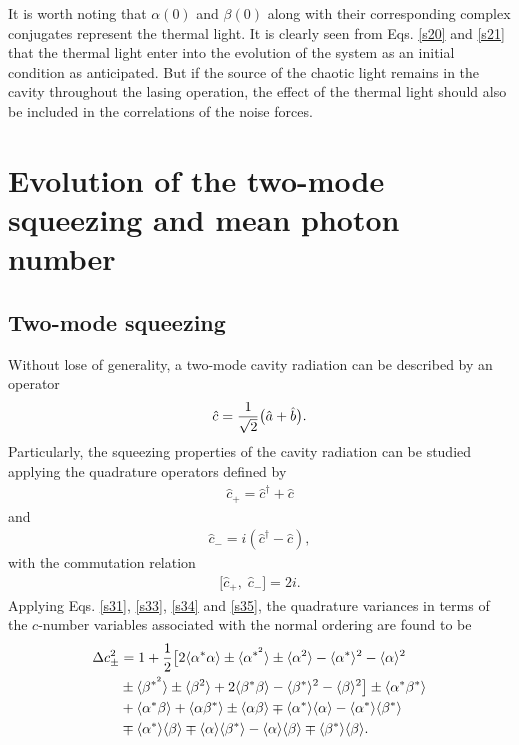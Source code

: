\documentclass[twocolumn,showpacs,preprintnumbers,amsmath,amssymb,pra]{revtex4}
\begin{document}
It is worth noting that  $\alpha(0)$ and $\beta(0)$ along with their corresponding complex conjugates represent the thermal light. It is clearly seen from Eqs. \eqref{s20} and \eqref{s21} that the thermal light enter into the evolution of the system as an initial condition as anticipated. But if the source of the chaotic light remains in the cavity throughout the lasing operation, the effect of the thermal light should also be included in the correlations of the noise forces. 

\section{Evolution of the two-mode squeezing and mean photon number}

\subsection{Two-mode squeezing}

Without lose of generality, a two-mode cavity radiation can be described by an
operator
\begin{align}\label{s31}\hat{c}={1\over\sqrt{2}}\big(\hat{a}+\hat{b}\big).\end{align}
Particularly, the squeezing properties of the
cavity radiation can be studied applying the quadrature operators
defined by
\begin{align}\label{s33}\hat{c}_{+}=\hat{c}^{\dagger}+\hat{c}\end{align}
and
\begin{align}\label{s34}\hat{c}_{-}=i(\hat{c}^{\dagger}-\hat{c}),\end{align} with the commutation relation 
\begin{align}\label{s35}\big[\hat{c}_{+},\;\hat{c}_{-}\big]=2i.\end{align}
Applying Eqs. \eqref{s31},  \eqref{s33}, \eqref{s34} and \eqref{s35}, the quadrature variances in terms of the $c$-number variables associated with the normal ordering are found to be
\begin{align}\label{s36}\Delta c_{\pm}^{2}& =1+ \frac{1}{2}\big[2\langle\alpha^{*}\alpha\rangle
\pm\langle\alpha^{*^{2}}\rangle \pm \langle\alpha^{2}\rangle   -
\langle\alpha^{*}\rangle^{2} - \langle\alpha\rangle^{2} \notag\\&\pm
\langle\beta^{*^{2}}\rangle \pm \langle\beta^{2}\rangle +
2\langle\beta^{*}\beta\rangle - \langle\beta^{*}\rangle^{2} -
\langle\beta\rangle^{2}\big] \pm \langle\alpha^{*}\beta^{*}\rangle\notag\\&
+ \langle\alpha^{*}\beta\rangle + \langle\alpha\beta^{*}\rangle
\pm \langle\alpha\beta\rangle \mp
\langle\alpha^{*}\rangle\langle\alpha\rangle-
\langle\alpha^{*}\rangle\langle\beta^{*}\rangle \notag\\&\mp
\langle\alpha^{*}\rangle\langle\beta\rangle \mp
\langle\alpha\rangle\langle\beta^{*}\rangle -
\langle\alpha\rangle\langle\beta\rangle \mp
\langle\beta^{*}\rangle\langle\beta\rangle. \end{align}
\end{document}
